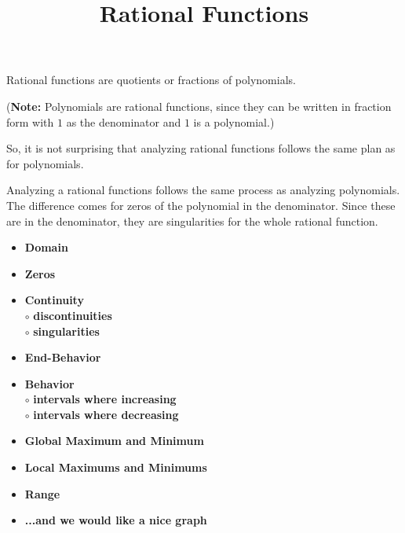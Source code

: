 \documentclass{ximera}
\title{Rational Functions}
\begin{document}
\begin{abstract}
\end{abstract}
\maketitle












Rational functions are quotients or fractions of polynomials.  


(\textbf{Note:} Polynomials are rational functions, since they can be written in fraction form with $1$ as the denominator and $1$ is a polynomial.)  


So, it is not surprising that analyzing rational functions follows the same plan as for polynomials. 


Analyzing a rational functions follows the same process as analyzing polynomials.  The difference comes for zeros of the polynomial in the denominator.  Since these are in the denominator, they are singularities for the whole rational function.








\begin{itemize}
     \item \textbf{\textcolor{red!70!black}{Domain}} 
     \item \textbf{\textcolor{red!70!black}{Zeros}} 
     \item \textbf{\textcolor{red!70!black}{Continuity}} \\
     \text{    }$\circ$ \textbf{\textcolor{purple!85!blue}{discontinuities}}\\
     \text{    }$\circ$ \textbf{\textcolor{purple!85!blue}{singularities}}\\
     \item \textbf{\textcolor{red!70!black}{End-Behavior}} 
     \item \textbf{\textcolor{red!70!black}{Behavior}} \\
     \text{    }$\circ$ \textbf{\textcolor{purple!85!blue}{intervals where increasing}}\\
     \text{    }$\circ$ \textbf{\textcolor{purple!85!blue}{intervals where decreasing}}\\
     \item \textbf{\textcolor{red!70!black}{Global Maximum and Minimum}} 
     \item \textbf{\textcolor{red!70!black}{Local Maximums and Minimums}} 
     \item \textbf{\textcolor{red!70!black}{Range}} 
     \item \textbf{\textcolor{blue!55!black}{...and we would like a nice graph}} 
\end{itemize}
\end{document}
